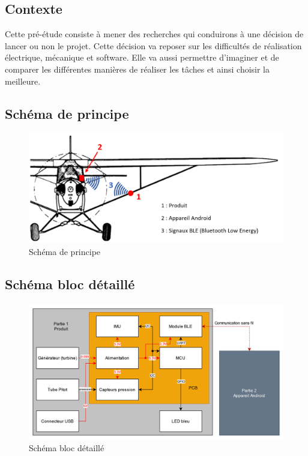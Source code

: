 \subsection{Contexte}
    Cette pré-étude consiste à mener des recherches qui conduirons à une décision de lancer ou non le projet. Cette décision va reposer sur les difficultés de réalisation électrique, mécanique et software. Elle va aussi permettre d'imaginer et de comparer les différentes manières de réaliser les tâches et ainsi choisir la meilleure. 
    \vspace{1 cm}
    
\subsection{Schéma de principe}
    \begin{figure}[h]
        \caption{Schéma de principe}
        \centering
        \includegraphics[width=15cm]{Images/piper-cub-j-3-3_modified2.png}
    \end{figure}
    \newpage
    
\subsection{Schéma bloc détaillé}
    \begin{figure}[h]
        \caption{Schéma bloc détaillé}
        \centering
        \includegraphics[width=15cm]{Images/SchemaBlocRapport_v1.0.1.drawio.png}
    \end{figure}
    \vspace{1 cm}
    
